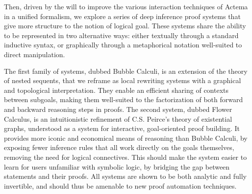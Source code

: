 
Then, driven by the will to improve the various interaction techniques of Actema
in a unified formalism, we explore a series of deep inference proof systems that
give more structure to the notion of logical goal. These systems share the
ability to be represented in two alternative ways: either textually through a
standard inductive syntax, or graphically through a metaphorical notation
well-suited to direct manipulation.

The first family of systems, dubbed Bubble Calculi, is an extension of the
theory of nested sequents, that we reframe as local rewriting systems with a
graphical and topological interpretation. They enable an efficient sharing of
contexts between subgoals, making them well-suited to the factorization of both
forward and backward reasoning steps in proofs. The second system, dubbed Flower
Calculus, is an intuitionistic refinement of C.S. Peirce's theory of existential
graphs, understood as a system for interactive, goal-oriented proof building. It
provides more iconic and economical means of reasoning than Bubble Calculi, by
exposing fewer inference rules that all work directly on the goals themselves,
removing the need for logical connectives. This should make the system easier to
learn for users unfamiliar with symbolic logic, by bridging the gap between
statements and their proofs. All systems are shown to be both analytic and fully
invertible, and should thus be amenable to new proof automation techniques.


